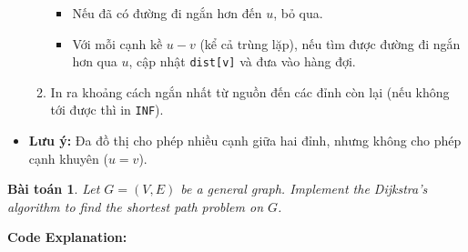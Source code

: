 \documentclass{article}
\newtheorem{baitoan}{Bài toán}
\begin{document}
\begin{itemize}
\begin{enumerate}
\begin{itemize}
            \item Nếu đã có đường đi ngắn hơn đến $u$, bỏ qua.
            \item Với mỗi cạnh kề $u-v$ (kể cả trùng lặp), nếu tìm được đường đi ngắn hơn qua $u$, cập nhật \texttt{dist[v]} và đưa vào hàng đợi.
        \end{itemize}
        \item In ra khoảng cách ngắn nhất từ nguồn đến các đỉnh còn lại (nếu không tới được thì in \texttt{INF}).
    \end{enumerate}
    \item \textbf{Lưu ý:} Đa đồ thị cho phép nhiều cạnh giữa hai đỉnh, nhưng không cho phép cạnh khuyên ($u = v$).
\end{itemize}

\begin{baitoan}
    Let $G = (V,E)$ be a general graph. Implement the Dijkstra's algorithm to find the shortest path problem on $G$.
\end{baitoan}


\textbf{Code Explanation:}
\end{document}
